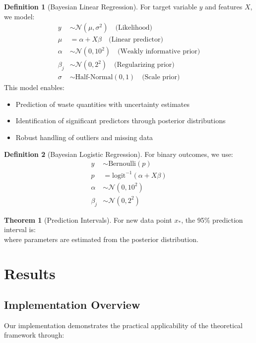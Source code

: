 \documentclass[12pt]{article}
\theoremstyle{definition}
\newtheorem{definition}{Definition}
\newtheorem{theorem}{Theorem}
\begin{document}
\begin{definition}[Bayesian Linear Regression]
For target variable $y$ and features $X$, we model:
\begin{align*}
    y &\sim \mathcal{N}(\mu, \sigma^2) \quad \text{(Likelihood)} \\
    \mu &= \alpha + X\beta \quad \text{(Linear predictor)} \\
    \alpha &\sim \mathcal{N}(0, 10^2) \quad \text{(Weakly informative prior)} \\
    \beta_j &\sim \mathcal{N}(0, 2^2) \quad \text{(Regularizing prior)} \\
    \sigma &\sim \text{Half-Normal}(0, 1) \quad \text{(Scale prior)}
\end{align*}
This model enables:
\begin{itemize}
    \item Prediction of waste quantities with uncertainty estimates
    \item Identification of significant predictors through posterior distributions
    \item Robust handling of outliers and missing data
\end{itemize}
\end{definition}

\begin{definition}[Bayesian Logistic Regression]
For binary outcomes, we use:
\begin{align*}
    y &\sim \text{Bernoulli}(p) \\
    p &= \text{logit}^{-1}(\alpha + X\beta) \\
    \alpha &\sim \mathcal{N}(0, 10^2) \\
    \beta_j &\sim \mathcal{N}(0, 2^2)
\end{align*}
\end{definition}

\begin{theorem}[Prediction Intervals]
For new data point $x_*$, the 95\% prediction interval is:
\begin{equation}
    [\hat{y}_* \pm 1.96 \sqrt{\text{Var}(\alpha) + x_*^T \text{Cov}(\beta) x_* + \sigma^2}]
\end{equation}
where parameters are estimated from the posterior distribution.
\end{theorem}

\section{Results}
\subsection{Implementation Overview}
Our implementation demonstrates the practical applicability of the theoretical framework through:
\end{document}
